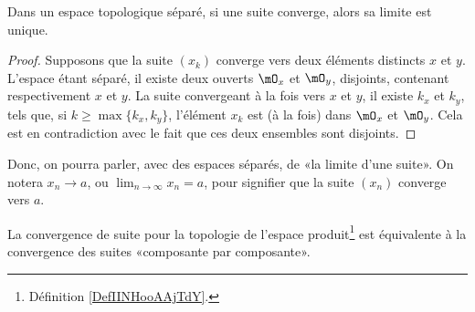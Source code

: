 \begin{proposition}\label{PropUniciteLimitePourSuites}
	Dans un espace topologique séparé, si une suite converge, alors sa limite est unique.
\end{proposition}
\begin{proof}
	Supposons que la suite \( (x_k)\) converge vers deux éléments distincts \( x \) et \( y \). L'espace étant séparé, il existe deux ouverts \( \mO_x \) et \( \mO_y \), disjoints, contenant respectivement \( x \) et \( y \). La suite convergeant à la fois vers \( x \) et \( y \), il existe \( k_x \) et \( k_y \), tels que, si \( k \geq \max\{k_x, k_y\} \), l'élément  \( x_k \) est (à la fois) dans  \( \mO_x \) et \( \mO_y \). Cela est en contradiction avec le fait que ces deux ensembles sont disjoints.
\end{proof}

\begin{normaltext}
	Donc, on pourra parler, avec des espaces séparés, de «la limite d'une suite». On notera \( x_n\to a\), ou \(\lim_{n\to \infty} x_n = a \), pour signifier que la suite \( (x_n) \) converge vers \( a \).
\end{normaltext}

\begin{proposition}      \label{PROPooNRRIooCPesgO}
	La convergence de suite pour la topologie de l'espace produit\footnote{Définition \ref{DefIINHooAAjTdY}.} est équivalente à la convergence des suites «composante par composante».
\end{proposition}

